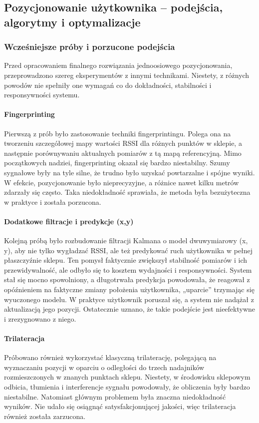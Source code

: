 \subsection{Pozycjonowanie użytkownika – podejścia, algorytmy i optymalizacje}

\subsubsection{Wcześniejsze próby i porzucone podejścia}
Przed opracowaniem finalnego rozwiązania jednoosiowego pozycjonowania, przeprowadzono szereg eksperymentów z innymi technikami. Niestety, z różnych powodów nie spełniły one wymagań co do dokładności, stabilności i responsywności systemu.

\paragraph{Fingerprinting}
Pierwszą z prób było zastosowanie techniki fingerprintingu. Polega ona na tworzeniu szczegółowej mapy wartości RSSI dla różnych punktów w sklepie, a następnie porównywaniu aktualnych pomiarów z tą mapą referencyjną. Mimo początkowych nadziei, fingerprinting okazał się bardzo niestabilny. Szumy sygnałowe były na tyle silne, że trudno było uzyskać powtarzalne i spójne wyniki. W efekcie, pozycjonowanie było nieprecyzyjne, a różnice nawet kilku metrów zdarzały się często. Taka niedokładność sprawiała, że metoda była bezużyteczna w praktyce i została porzucona.

\paragraph{Dodatkowe filtracje i predykcje (x,y)}
Kolejną próbą było rozbudowanie filtracji Kalmana o model dwuwymiarowy (x, y), aby nie tylko wygładzać RSSI, ale też predykować ruch użytkownika w pełnej płaszczyźnie sklepu. Ten pomysł faktycznie zwiększył stabilność pomiarów i ich przewidywalność, ale odbyło się to kosztem wydajności i responsywności. System stał się mocno spowolniony, a długotrwała predykcja powodowała, że reagował z opóźnieniem na faktyczne zmiany położenia użytkownika, „uparcie” trzymając się wyuczonego modelu. W praktyce użytkownik poruszał się, a system nie nadążał z aktualizacją jego pozycji. Ostatecznie uznano, że takie podejście jest nieefektywne i zrezygnowano z niego.

\paragraph{Trilateracja}
Próbowano również wykorzystać klasyczną trilaterację, polegającą na wyznaczaniu pozycji w oparciu o odległości do trzech nadajników rozmieszczonych w znanych punktach sklepu. Niestety, w środowisku sklepowym odbicia, tłumienia i interferencje sygnału powodowały, że obliczenia były bardzo niestabilne. Natomiast głównym problemem była znaczna niedokładność wyników. Nie udało się osiągnąć satysfakcjonującej jakości, więc trilateracja również została zarzucona.

